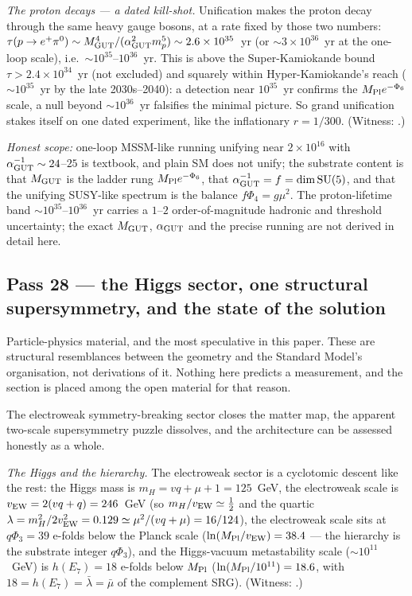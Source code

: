 \documentclass[11pt]{article}
\begin{document}
\emph{The proton decays --- a dated kill-shot.} Unification makes the proton decay through the same
heavy gauge bosons, at a rate fixed by those two numbers: $\tau(p\to e^+\pi^0)\sim M_{\rm GUT}^4/
(\alpha_{\rm GUT}^2 m_p^5)\sim2.6\times10^{35}$~yr (or $\sim3\times10^{36}$~yr at the one-loop scale),
i.e.\ $\sim10^{35}$--$10^{36}$~yr. This is above the Super-Kamiokande bound $\tau>2.4\times10^{34}$~yr
(not excluded) and squarely within Hyper-Kamiokande's reach ($\sim10^{35}$~yr by the late
2030s--2040): a detection near $10^{35}$~yr confirms the $M_{\rm Pl}e^{-\Phi_6}$ scale, a null beyond
$\sim10^{36}$~yr falsifies the minimal picture. So grand unification stakes itself on one dated
experiment, like the inflationary $r=1/300$. (Witness:
.)

\emph{Honest scope:} one-loop MSSM-like running unifying near $2\times10^{16}$ with
$\alpha_{\rm GUT}^{-1}\sim24$--$25$ is textbook, and plain SM does not unify; the substrate content
is that $M_{\rm GUT}$ is the ladder rung $M_{\rm Pl}e^{-\Phi_6}$, that $\alpha_{\rm GUT}^{-1}=f=
\dim\mathrm{SU}(5)$, and that the unifying SUSY-like spectrum is the balance $f\Phi_4=g\mu^2$. The
proton-lifetime band $\sim10^{35}$--$10^{36}$~yr carries a $1$--$2$ order-of-magnitude hadronic and
threshold uncertainty; the exact $M_{\rm GUT}$, $\alpha_{\rm GUT}$ and the precise running are not
derived in detail here.

\subsection{Pass 28 --- the Higgs sector, one structural supersymmetry, and the state of the solution}

\begin{plainbox}
Particle-physics material, and the most speculative in this paper. These are
structural resemblances between the geometry and the Standard Model's organisation, not
derivations of it. Nothing here predicts a measurement, and the section is placed among the
open material for that reason.
\end{plainbox}

\label{sec:capstone-twentyeight}

The electroweak symmetry-breaking sector closes the matter map, the apparent two-scale
supersymmetry puzzle dissolves, and the architecture can be assessed honestly as a whole.

\emph{The Higgs and the hierarchy.} The electroweak sector is a cyclotomic descent like the rest:
the Higgs mass is $m_H=vq+\mu+1=125$~GeV, the electroweak scale is $v_{\rm EW}=2(vq+q)=246$~GeV (so
$m_H/v_{\rm EW}\simeq\tfrac12$ and the quartic $\lambda=m_H^2/2v_{\rm EW}^2=0.129\simeq\mu^2/(vq+\mu)
=16/124$), the electroweak scale sits at $q\Phi_3=39$ e-folds below the Planck scale
($\ln(M_{\rm Pl}/v_{\rm EW})=38.4$ --- the hierarchy is the substrate integer $q\Phi_3$), and the
Higgs-vacuum metastability scale ($\sim10^{11}$~GeV) is $h(E_7)=18$ e-folds below $M_{\rm Pl}$
($\ln(M_{\rm Pl}/10^{11})=18.6$, with $18=h(E_7)=\bar\lambda=\bar\mu$ of the complement SRG).
(Witness: .)
\end{document}
